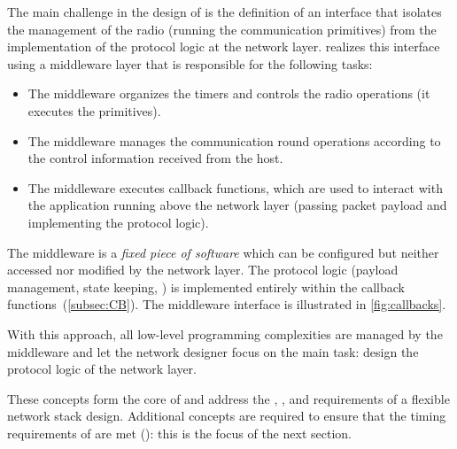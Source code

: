 The main challenge in the design of \baloo is the definition of an interface that isolates the management of the radio (\ie running the \ST communication primitives) from the implementation of the protocol logic at the network layer.
%
\baloo realizes this interface using a middleware layer that is responsible for the following tasks:
\begin{itemize}[nosep]

	\item The middleware organizes the timers and controls the radio operations (\ie it executes the \ST primitives).

	\item The middleware manages the communication round operations according to the control information received from the host.

	\item The middleware executes callback functions, which are used to interact with the application running above the network layer (\ie passing packet payload and implementing the protocol logic).

\end{itemize}
The middleware is a \textsl{fixed piece of software} which can be configured but neither accessed nor modified by the network layer.
The protocol logic (payload management, state keeping, \etc) is implemented entirely within the callback functions~(\cref{subsec:CB}).%
The middleware interface is illustrated in \cref{fig:callbacks}.

With this approach, all low-level programming complexities are managed by the middleware and let the network designer focus on the main task: design the protocol logic of the network layer.

These concepts form the core of \baloo and address the , ,  and  requirements of a flexible network stack design.
Additional concepts are required to ensure that the timing requirements of \ST are met (): this is the focus of the next section.
